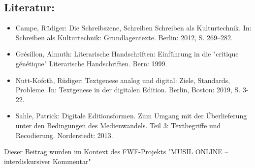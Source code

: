 \documentclass{article}
\begin{document}
        \subsection*{Literatur:}\begin{itemize}\item Campe, Rüdiger: Die Schreibszene, Schreiben Schreiben als Kulturtechnik. In: Schreiben als Kulturtechnik: Grundlagentexte. Berlin: 2012, S. 269–282.\item Grésillon, Almuth: Literarische Handschriften: Einführung in die "critique
                              génétique" Literarische Handschriften. Bern: 1999.\item Nutt-Kofoth, Rüdiger: Textgenese analog und digital: Ziele, Standards,
                              Probleme. In: Textgenese in der digitalen Edition. Berlin, Boston: 2019, S. 3-22.\item Sahle, Patrick: Digitale Editionsformen. Zum Umgang mit der
                              Überlieferung unter den Bedingungen des Medienwandels. Teil 3:
                              Textbegriffe und Recodierung. Norderstedt: 2013.\end{itemize}Dieser Beitrag wurden im Kontext des FWF-Projekts "MUSIL ONLINE – interdiskursiver Kommentar" 
\end{document}
